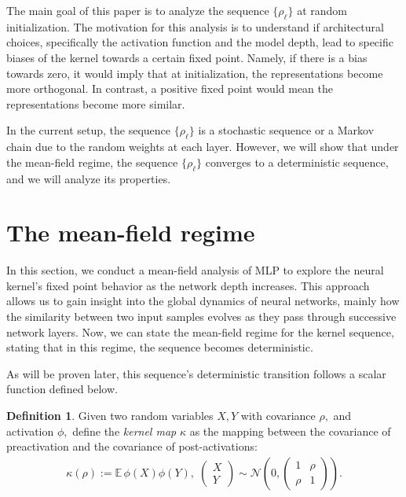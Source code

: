 \documentclass[twoside]{article}
\newcommand{\E}{\mathbb{E}\,}
\theoremstyle{definition}
\newtheorem{definition}{Definition}
\begin{document}
The main goal of this paper is to analyze the sequence $\{\rho_\ell\}$ at random initialization. The motivation for this analysis is to understand if architectural choices, specifically the activation function and the model depth, lead to specific biases of the kernel towards a certain fixed point. Namely, if there is a bias towards zero, it would imply that at initialization, the representations become more orthogonal. In contrast, a positive fixed point would mean the representations become more similar.

In the current setup, the sequence $\{\rho_\ell\}$ is a stochastic sequence or a Markov chain due to the random weights at each layer. However, we will show that under the mean-field regime, the sequence $\{\rho_\ell\}$ converges to a deterministic sequence, and we will analyze its properties.


\section{The mean-field regime}

In this section, we conduct a mean-field analysis of MLP to explore the neural kernel's fixed point behavior as the network depth increases. This approach allows us to gain insight into the global dynamics of neural networks, mainly how the similarity between two input samples evolves as they pass through successive network layers.
Now, we can state the mean-field regime for the kernel sequence, stating that in this regime, the sequence becomes deterministic. 

As will be proven later, this sequence's deterministic transition follows a scalar function defined below. 

\begin{definition}
    \label{def:kernel_map}
Given two random variables $X, Y$ with covariance $\rho,$ and activation $\phi,$ define the \emph{kernel map } $\kappa$ as the mapping between the covariance of preactivation and the covariance of post-activations:
\begin{align}
 \kappa(\rho):=\E\phi(X)\phi(Y), \; 
 \begin{pmatrix}X \\ Y\end{pmatrix}\sim \mathcal N\left(0, \begin{pmatrix} 1 & \rho \\ \rho & 1 \end{pmatrix}
 \right).
 \label{eq:kernel_map}
\end{align}
\end{definition}
\end{document}
